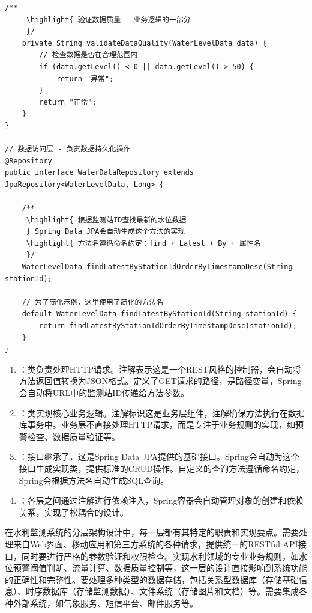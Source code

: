 \begin{lstlisting}[style=java]
    /**
     \highlight{ 验证数据质量 - 业务逻辑的一部分
     }/
    private String validateDataQuality(WaterLevelData data) {
        // 检查数据是否在合理范围内
        if (data.getLevel() < 0 || data.getLevel() > 50) {
            return "异常";
        }
        return "正常";
    }
}

// 数据访问层 - 负责数据持久化操作
@Repository
public interface WaterDataRepository extends JpaRepository<WaterLevelData, Long> {
    
    /**
     \highlight{ 根据监测站ID查找最新的水位数据
     } Spring Data JPA会自动生成这个方法的实现
     \highlight{ 方法名遵循命名约定：find + Latest + By + 属性名
     }/
    WaterLevelData findLatestByStationIdOrderByTimestampDesc(String stationId);
    
    // 为了简化示例，这里使用了简化的方法名
    default WaterLevelData findLatestByStationId(String stationId) {
        return findLatestByStationIdOrderByTimestampDesc(stationId);
    }
}
\end{lstlisting}


\begin{enumerate}
\def\labelenumi{\arabic{enumi}.}
\item
  ：类负责处理HTTP请求。注解表示这是一个REST风格的控制器，会自动将方法返回值转换为JSON格式。定义了GET请求的路径，是路径变量，Spring会自动将URL中的监测站ID传递给方法参数。
\item
  ：类实现核心业务逻辑。注解标识这是业务层组件，注解确保方法执行在数据库事务中。业务层不直接处理HTTP请求，而是专注于业务规则的实现，如预警检查、数据质量验证等。
\item
  ：接口继承了，这是Spring Data JPA提供的基础接口。Spring会自动为这个接口生成实现类，提供标准的CRUD操作。自定义的查询方法遵循命名约定，Spring会根据方法名自动生成SQL查询。
\item
  ：各层之间通过注解进行依赖注入，Spring容器会自动管理对象的创建和依赖关系，实现了松耦合的设计。
\end{enumerate}

在水利监测系统的分层架构设计中，每一层都有其特定的职责和实现要点。需要处理来自Web界面、移动应用和第三方系统的各种请求，提供统一的RESTful API接口，同时要进行严格的参数验证和权限检查。实现水利领域的专业业务规则，如水位预警阈值判断、流量计算、数据质量控制等，这一层的设计直接影响到系统功能的正确性和完整性。要处理多种类型的数据存储，包括关系型数据库（存储基础信息）、时序数据库（存储监测数据）、文件系统（存储图片和文档）等。需要集成各种外部系统，如气象服务、短信平台、邮件服务等。

